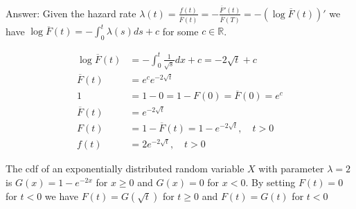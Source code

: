 \documentclass{article}
\begin{document}
\begin{enumerate}
Answer: Given the hazard rate $\lambda(t) = \frac{f(t)}{\overline{F}(t)} = -\frac{\overline{F}'(t)}{\overline{F}(T)} = -(\log \overline{F}(t))'$ we have
$\log \overline{F}(t) = -\int_0^t \lambda(s) ds + c$ for some $c \in \mathbb{R}$.

\begin{align*}
\log \overline{F}(t) &= -\int_0^t \frac{1}{\sqrt{s}} dx + c= -2\sqrt{t} + c \\
\overline{F}(t) &= e^c e^{-2\sqrt{t}} \\
1 &= 1-0 = 1-F(0) = \overline{F}(0) = e^c \\
\overline{F}(t) &= e^{-2\sqrt{t}} \\
F(t) &= 1- \overline{F}(t) = 1-e^{-2\sqrt{t}}, \quad t > 0 \\
f(t) &= 2e^{-2\sqrt{t}}, \quad t > 0
\end{align*}

The cdf of an exponentially distributed random variable $X$ with parameter $\lambda = 2$ is $G(x) = 1 - e^{-2 x}$ for $x \geq 0$ and $G(x) = 0$ for $x < 0$. By setting $F(t) = 0$ for $t < 0$ we have $F(t) = G(\sqrt{t})$ for $t \geq 0$ and $F(t) = G(t)$ for $t < 0$



\end{enumerate}
\end{document}

